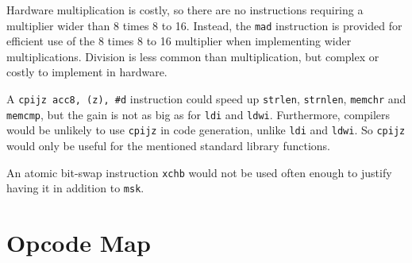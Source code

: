 \documentclass{book}
\begin{document}
Hardware multiplication is costly, so there are no instructions requiring a multiplier wider than 8 times 8 to 16. Instead, the \texttt{mad} instruction is provided for efficient use of the 8 times 8 to 16 multiplier when implementing wider multiplications. Division is less common than multiplication, but complex or costly to implement in hardware.

A \texttt{cpijz acc8, (z), \#d} instruction could speed up \texttt{strlen}, \texttt{strnlen}, \texttt{memchr} and \texttt{memcmp}, but the gain is not as big as for \texttt{ldi} and \texttt{ldwi}. Furthermore, compilers would be unlikely to use \texttt{cpijz} in code generation, unlike \texttt{ldi} and \texttt{ldwi}. So \texttt{cpijz} would only be useful for the mentioned standard library functions.

An atomic bit-swap instruction \texttt{xchb} would not be used often enough to justify having it in addition to \texttt{msk}.


\chapter{Opcode Map}
\end{document}
